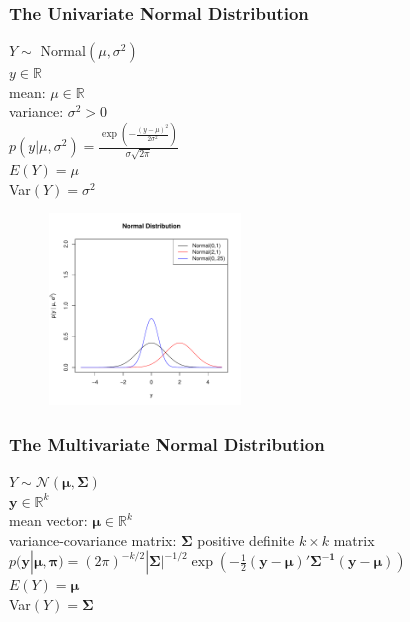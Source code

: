 \documentclass[handout]{beamer}
\begin{document}
\begin{frame}
\frametitle{The Univariate Normal Distribution}
\begin{multicols}{2}
\pause
$Y \sim$ Normal$(\mu, \sigma^2)$\\
\bigskip
\pause
$y \in \mathbb{R}$\\
\bigskip
\pause
mean: $\mu \in \mathbb{R}$\\
\pause
variance: $\sigma^2 > 0$\\
\bigskip
\pause
$p(y|\mu, \sigma^2) = \frac{\exp \left( {-\frac{(y - \mu)^2}{2\sigma^2} } \right)}{\sigma \sqrt{2 \pi}}$\\
\bigskip
\bigskip
\pause
$E(Y) = \mu$\\
\bigskip
\pause
Var$(Y) = \sigma^2$
\pause


\begin{figure}[!htp]
\begin{center}
\includegraphics[width=2in, height=2in]{probability-normal.pdf}
\end{center}
\end{figure}
\end{multicols}
\end{frame}



\begin{frame}
\frametitle{The Multivariate Normal Distribution}
\pause
$Y \sim \mathcal{N}(\bm{\mu},\bm{\Sigma})$\\
\bigskip
\pause
$\mathbf{y} \in \mathbb{R}^k$\\
\bigskip
\pause
mean vector: $\bm{\mu} \in \mathbb{R}^k$\\
\pause
variance-covariance matrix: $\bm{\Sigma}$ positive definite $k \times
k$ matrix\\
\bigskip
\pause
$p(\mathbf{y}|\bm{\mu},\bm{\pi}) = (2\pi)^{-k/2} | \bm{\Sigma}
|^{-1/2} \exp{\left( -\frac{1}{2} (\bm{y} - \bm{\mu})'
\bm{\Sigma^{-1}} (\bm{y} - \bm{\mu}) \right)}$\\
\bigskip
\bigskip
\pause
$E(Y) = \bm{\mu}$\\
\bigskip
\pause
Var$(Y) = \bm{\Sigma}$\\
\end{frame}
\end{document}
